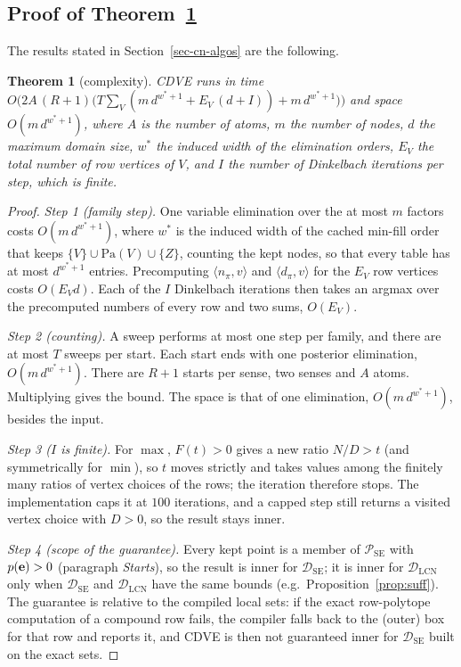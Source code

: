 \documentclass{article} %
\newenvironment{revblock}{\color{blue}}{}
\newtheorem{theorem}{Theorem}
\newcommand{\DSE}{\mathcal{D}_{\mathrm{SE}}}
\newcommand{\DLCN}{\mathcal{D}_{\mathrm{LCN}}}
\providecommand{\Pa}{\mathrm{Pa}}
\begin{document}
\subsection{Proof of Theorem~\ref{thm:cdve-cplx}}

\begin{revblock}The results stated in Section~\ref{sec-cn-algos} are the following.\end{revblock}

\begin{theorem}[complexity]\label{thm:cdve-cplx}
    CDVE runs in time $O\bigl(2A\,(R{+}1)\bigl(T\sum_V(m\,d^{w^*+1}+E_V\,(d+I))+m\,d^{w^*+1}\bigr)\bigr)$ and space $O(m\,d^{w^*+1})$, where $A$ is the number of atoms, $m$ the number of nodes, $d$ the maximum domain size, $w^*$ the induced width of the elimination orders, $E_V$ the total number of row vertices of $V$, and $I$ the number of Dinkelbach iterations per step, which is finite.
\end{theorem}

\begin{proof}
\emph{Step 1 (family step).} One variable elimination over the at most $m$ factors costs
$O(m\,d^{w^*+1})$, where $w^*$ is the induced width of the cached min-fill order that keeps
$\{V\}\cup\Pa(V)\cup\{Z\}$, counting the kept nodes, so that every table has at most
$d^{w^*+1}$ entries. Precomputing $\langle n_\pi,v\rangle$ and $\langle d_\pi,v\rangle$ for
the $E_V$ row vertices costs $O(E_Vd)$. Each of the $I$ Dinkelbach iterations then takes an
argmax over the precomputed numbers of every row and two sums, $O(E_V)$.

\emph{Step 2 (counting).} A sweep performs at most one step per family, and there are at most
$T$ sweeps per start. Each start ends with one posterior elimination, $O(m\,d^{w^*+1})$.
There are $R{+}1$ starts per sense, two senses and $A$ atoms. Multiplying gives the bound. The
space is that of one elimination, $O(m\,d^{w^*+1})$, besides the input.

\emph{Step 3 ($I$ is finite).} For $\max$, $F(t)>0$ gives a new ratio $N/D>t$ (and
symmetrically for $\min$), so $t$ moves strictly and takes values among the finitely many
ratios of vertex choices of the rows; the iteration therefore stops. The implementation
caps it at $100$ iterations, and a capped step still returns a visited vertex choice with
$D>0$, so the result stays inner.

\emph{Step 4 (scope of the guarantee).} Every kept point is a member of $\mathcal
P_{\mathrm{SE}}$ with $p(\mathbf{e})>0$ (paragraph \emph{Starts}), so the result is inner for
$\DSE$; it is inner for $\DLCN$ only when $\DSE$ and $\DLCN$ have the same bounds (e.g.\
Proposition~\ref{prop:suff}). The guarantee is relative to the compiled local sets: if the
exact row-polytope computation of a compound row fails, the compiler falls back to the
(outer) box for that row and reports it, and CDVE is then not guaranteed inner for $\DSE$
built on the exact sets.
\end{proof}
\end{document}
